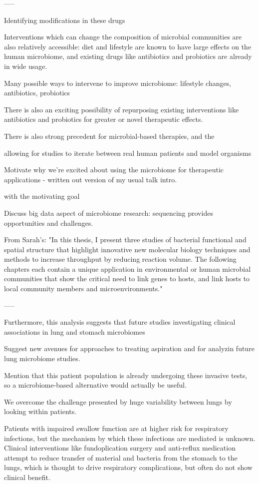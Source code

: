 -----

Identifying modifications in these drugs

Interventions which can change the composition of microbial communities are also relatively accessible: diet and lifestyle are known to have large effects on the human microbiome, and existing drugs like antibiotics and probiotics are already in wide usage.

Many possible ways to intervene to improve microbiome: lifestyle changes, antibiotics, probiotics

There is also an exciting possibility of repurposing existing interventions like antibiotics and probiotics for greater or novel therapeutic effects.

There is also strong precedent for microbial-based therapies, and the

allowing for studies to iterate between real human patients and model organisms

Motivate why we're excited about using the microbiome for therapeutic applications - written out version of my usual talk intro.

with the motivating goal

Discuss big data aspect of microbiome research: sequencing provides opportunities and challenges.

From Sarah's: "In this thesis, I present three studies of bacterial functional and spatial structure that highlight innovative new molecular biology techniques and methods to increase throughput by reducing reaction volume. The following chapters each contain a unique application in environmental or human microbial communities that show the critical need to link genes to hosts, and link hosts to local community members and microenvironments."

-----

Furthermore, this analysis suggests that future studies investigating clinical associations in lung and stomach microbiomes

Suggest new avenues for approaches to treating aspiration and for analyzin future lung microbiome studies.

Mention that this patient population is already undergoing these invasive tests, so a microbiome-based alternative would actually be useful.

We overcome the challenge presented by huge variability between lungs by looking within patients.

Patients with impaired swallow function are at higher risk for respiratory infections, but the mechanism by which these infections are mediated is unknown.
Clinical interventions like fundoplication surgery and anti-reflux medication attempt to reduce transfer of material and bacteria from the stomach to the lungs, which is thought to drive respiratory complications, but often do not show clinical benefit.

